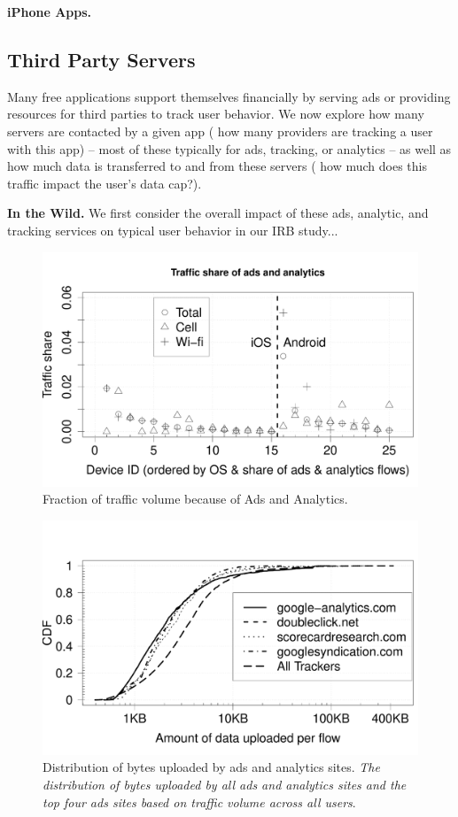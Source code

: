   {\bf iPhone Apps.}

\subsection{Third Party Servers}
  Many free applications support themselves financially by serving ads or providing resources for third parties to track user behavior.
  We now explore how many servers are contacted by a given app (\ie{} how many providers are tracking a user with this app) -- most of these typically for ads, tracking, or analytics -- as well as how much data is transferred to and from these servers (\ie{} how much does this traffic impact the user's data cap?).

  {\bf In the Wild.}
  We first consider the overall impact of these ads, analytic, and tracking services on typical user behavior in our IRB study...

\begin{figure}[t]
\includegraphics[width=\columnwidth]{plots/ad_share_bytes.pdf}
\caption{Fraction of traffic volume because of Ads and Analytics. \emph{}}
\label{fig:description}
\end{figure}

\begin{figure}[t]
\includegraphics[width=\columnwidth]{plots/distrib_ad_uploads.pdf}
\caption{Distribution of bytes uploaded by ads and analytics sites. \emph{The distribution of bytes uploaded by all ads and analytics sites and the top four ads sites based on traffic volume across all users}.}
\label{fig:description}
\end{figure}

